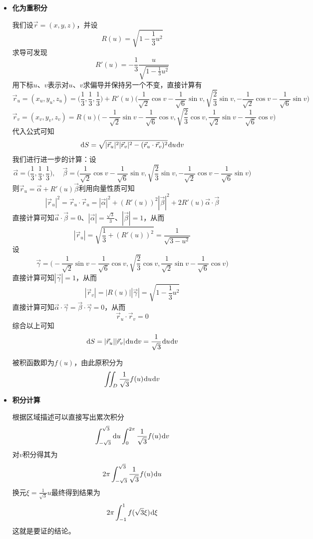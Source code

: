 \documentclass[a4paper,UTF8,fontset=windows,AutoFakeBold]{ctexart}
\newcommand*{\dr}{\hspace{0.07em}\mathrm{d}}
\newcommand*{\rv}{\vec{r}}
\theoremstyle{ex}
\begin{document}
\begin{framed}
{\begin{itemize}
        \item \textbf{化为重积分}
        
        我们设$\rv=(x,y,z)$，并设
        $$R(u)=\sqrt{1-\frac{1}{3}u^2}$$
        求导可发现
        $$R'(u)=-\frac{1}{3}\frac{u}{\sqrt{1-\frac{1}{3}u^2}}$$
        用下标$u$、$v$表示对$u$、$v$求偏导并保持另一个不变，直接计算有
        $$\rv_u=(x_u,y_u,z_u)=\bigg(\frac{1}{3},\frac{1}{3},\frac{1}{3}\bigg)+R'(u)\bigg(\frac{1}{\sqrt2}\cos v-\frac{1}{\sqrt6}\sin v,\sqrt{\frac{2}{3}}\sin v,-\frac{1}{\sqrt2}\cos v-\frac{1}{\sqrt6}\sin v\bigg)$$
        $$\rv_v=(x_v,y_v,z_v)=R(u)\bigg(-\frac{1}{\sqrt2}\sin v-\frac{1}{\sqrt6}\cos v,\sqrt{\frac{2}{3}}\cos v,\frac{1}{\sqrt2}\sin v-\frac{1}{\sqrt6}\cos v\bigg)$$
        代入公式可知
        $$\dr S=\sqrt{|\rv_u|^2|\rv_v|^2-(\rv_u\cdot\rv_v)^2}\dr u\dr v$$
        我们进行进一步的计算：设
        $$\vec{\alpha}=\bigg(\frac{1}{3},\frac{1}{3},\frac{1}{3}\bigg),\quad\vec{\beta}=\bigg(\frac{1}{\sqrt2}\cos v-\frac{1}{\sqrt6}\sin v,\sqrt{\frac{2}{3}}\sin v,-\frac{1}{\sqrt2}\cos v-\frac{1}{\sqrt6}\sin v\bigg)$$
        则$\rv_u=\vec{\alpha}+R'(u)\vec{\beta}$利用向量性质可知
        $$|\rv_u|^2=\rv_u\cdot\rv_u=|\vec{\alpha}|^2+(R'(u))^2|\vec{\beta}|^2+2R'(u)\vec{\alpha}\cdot\vec{\beta}$$
        直接计算可知$\vec{a}\cdot\vec{\beta}=0$、$|\vec{\alpha}|=\frac{\sqrt3}{3}$、$|\vec{\beta}|=1$，从而
        $$|\rv_u|=\sqrt{\frac{1}{3}+(R'(u))^2}=\frac{1}{\sqrt{3-u^2}}$$
        设
        $$\vec{\gamma}=\bigg(-\frac{1}{\sqrt2}\sin v-\frac{1}{\sqrt6}\cos v,\sqrt{\frac{2}{3}}\cos v,\frac{1}{\sqrt2}\sin v-\frac{1}{\sqrt6}\cos v\bigg)$$
        直接计算可知$|\vec{\gamma}|=1$，从而
        $$|\rv_v|=|R(u)||\vec{\gamma}|=\sqrt{1-\frac{1}{3}u^2}$$
        直接计算可知$\vec{\alpha}\cdot\vec{\gamma}=\vec{\beta}\cdot\vec{\gamma}=0$，从而
        $$\rv_u\cdot\rv_v=0$$
        综合以上可知
        $$\dr S=|\rv_u||\rv_v|\dr u\dr v=\frac{1}{\sqrt3}\dr u\dr v$$

        被积函数即为$f(u)$，由此原积分为
        $$\iint_D\frac{1}{\sqrt3}f(u)\dr u\dr v$$

        \item \textbf{积分计算}
        
        根据区域描述可以直接写出累次积分
        $$\int_{-\sqrt3}^{\sqrt3}\dr u\int_0^{2\pi}\frac{1}{\sqrt3}f(u)\dr v$$
        对$v$积分得其为
        $$2\pi\int_{-\sqrt3}^{\sqrt3}\frac{1}{\sqrt3}f(u)\dr u$$
        换元$\xi=\frac{1}{\sqrt3}u$最终得到结果为
        $$2\pi\int_{-1}^1f(\sqrt{3}\xi)\dr\xi$$
        这就是要证的结论。
    \end{itemize}
}
\end{framed}
\end{document}
